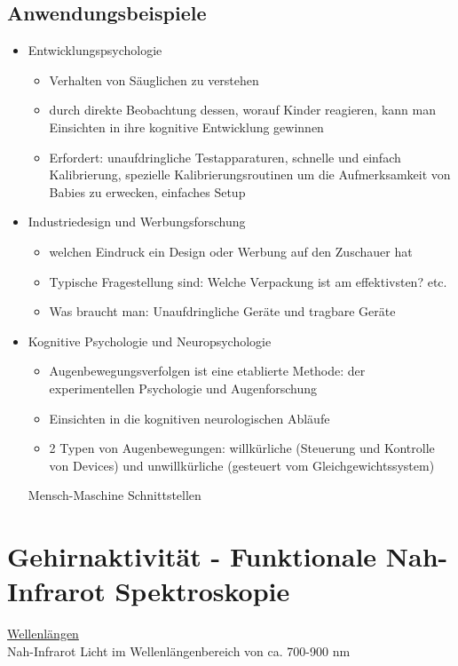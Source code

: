\documentclass[a4paper,10pt,oneside]{article}
\begin{document}
\subsection{Anwendungsbeispiele}
	\begin{itemize}
		\item Entwicklungspsychologie
			\begin{itemize}
				\item Verhalten von Säuglichen zu verstehen
				\item durch direkte Beobachtung dessen, worauf Kinder reagieren, kann man Einsichten in ihre kognitive Entwicklung gewinnen
				\item Erfordert: unaufdringliche Testapparaturen, schnelle und einfach Kalibrierung, spezielle Kalibrierungsroutinen um die Aufmerksamkeit von Babies zu erwecken, einfaches Setup
			\end{itemize}
		\item Industriedesign und Werbungsforschung
			\begin{itemize}
				\item welchen Eindruck ein Design oder Werbung auf den Zuschauer hat
				\item Typische Fragestellung sind: Welche Verpackung ist am effektivsten? etc.
				\item Was braucht man: Unaufdringliche Geräte und tragbare Geräte
			\end{itemize}
		\item Kognitive Psychologie und Neuropsychologie
			\begin{itemize}
				\item Augenbewegungsverfolgen ist eine etablierte Methode: der experimentellen Psychologie und Augenforschung
				\item Einsichten in die kognitiven neurologischen Abläufe
				\item 2 Typen von Augenbewegungen: willkürliche (Steuerung und Kontrolle von Devices) und unwillkürliche (gesteuert vom Gleichgewichtssystem)
			\end{itemize}
		\itme Mensch-Maschine Schnittstellen
	\end{itemize}
 
\section{Gehirnaktivität - Funktionale Nah-Infrarot Spektroskopie}
\underline{Wellenlängen} \\
Nah-Infrarot Licht im Wellenlängenbereich von ca. 700-900 nm
\end{document}
